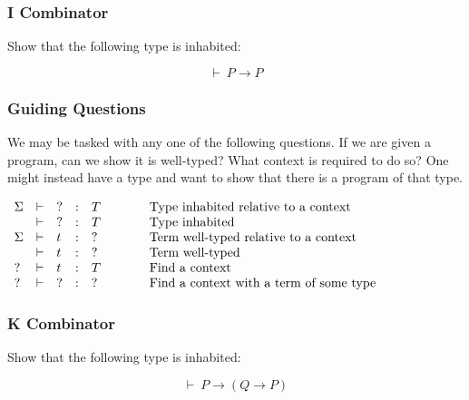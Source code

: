 \documentclass{beamer}
\theoremstyle{indentDefn} \newtheorem{defn}[]{Definition}
\begin{document}
\begin{frame}
  \frametitle{I Combinator}

  Show that the following type is inhabited: 

  $$ \vdash \ P \to P$$

  \vspace{70mm}
\end{frame}


\begin{frame}
  \frametitle{Guiding Questions}

  We may be tasked with any one of the following questions. If we are given a program, can we show it is well-typed? What context is required to do so? One might instead have a type and want to show that there is a program of that type.

  \begin{center}
    $\begin{array}{l l l l l l}
      \Sigma & \vdash & ? & : & T & \hspace{1cm} \text{Type inhabited relative to a context} \\
      \ & \vdash & ? & : & T & \hspace{1cm} \text{Type inhabited} \\
      \Sigma & \vdash & t & : & ? & \hspace{1cm} \text{Term well-typed relative to a context} \\
      \ & \vdash & t & : & ? & \hspace{1cm} \text{Term well-typed} \\
      ? & \vdash & t & : & T & \hspace{1cm} \text{Find a context} \\
      ? & \vdash & ? & : & ? & \hspace{1cm} \text{Find a context with a term of some type}
    \end{array}$
\end{center}

\vspace{50mm}

\end{frame}

\begin{frame}
  \frametitle{K Combinator}

  Show that the following type is inhabited:

  $$  \vdash \ P \to (Q \to P)$$

  \vspace{70mm}
\end{frame}
\end{document}
